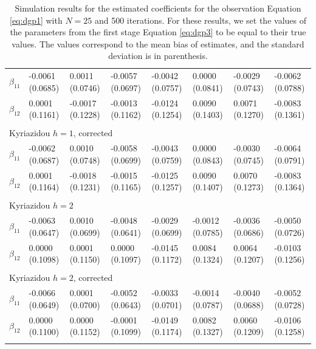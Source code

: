 \begin{table}
\begin{adjustwidth}{-.5in}{-.5in}
\begin{tabular}{p{3cm}p{1.3cm}p{1.3cm}p{1.3cm}p{1.3cm}p{1.3cm}p{1.3cm}p{1.3cm}}
       \hline
        $\beta_{11}$  & -0.0061 (0.0685) & 0.0011 (0.0746) & -0.0057 (0.0697) & -0.0042 (0.0757) & 0.0000 (0.0841) &  -0.0029 (0.0743) & -0.0062 (0.0788) \\
        $\beta_{12}$  & 0.0001 (0.1161) & -0.0017 (0.1228) & -0.0013 (0.1162) & -0.0124 (0.1254) & 0.0090 (0.1403) &  0.0071 (0.1270) & -0.0083 (0.1361) \\
         & & & & & & & \\
            \hline
        \multicolumn{8}{l}{Kyriazidou $h=1$, corrected} \\
       \hline
        $\beta_{11}$  & -0.0062 (0.0687) & 0.0010 (0.0748) & -0.0058 (0.0699) & -0.0043 (0.0759) & 0.0000 (0.0843) &  -0.0030 (0.0745) & -0.0064 (0.0791) \\
        $\beta_{12}$  & 0.0001 (0.1164) & -0.0018 (0.1231) & -0.0015 (0.1165) & -0.0125 (0.1257) & 0.0090 (0.1407) &  0.0070 (0.1273) & -0.0083 (0.1364)\\
         & & & & & & & \\
        \hline
        \multicolumn{8}{l}{Kyriazidou $h=2$} \\
        \hline
         $\beta_{11}$  & -0.0063 (0.0647) & 0.0010 (0.0699) & -0.0048 (0.0641) & -0.0029 (0.0699) &-0.0012 (0.0785)  & -0.0036 (0.0686) & -0.0050 (0.0726)\\
         $\beta_{12}$  & 0.0000 (0.1098) & 0.0001 (0.1150) & 0.0000 (0.1097) & -0.0145 (0.1172) & 0.0084 (0.1324) & 0.0064 (0.1207) & -0.0103 (0.1256) \\
         & & & & & & & \\
         \hline
         \multicolumn{8}{l}{Kyriazidou $h=2$, corrected} \\
        \hline
         $\beta_{11}$  & -0.0066 (0.0649) & 0.0001 (0.0700) & -0.0052 (0.0643) & -0.0033 (0.0701) & -0.0014 (0.0787) &  -0.0040 (0.0688) & -0.0052 (0.0728) \\
         $\beta_{12}$  & 0.0000 (0.1100) & 0.0000 (0.1152) & -0.0001 (0.1099) & -0.0149 (0.1174) & 0.0082 (0.1327) &  0.0060 (0.1209) & -0.0106 (0.1258)\\
              & & & & & & & \\
         \hline
    \end{tabular}
    \caption{\footnotesize{Simulation results for the estimated coefficients for the observation Equation \ref{eq:dgp1} with $N=25$ and 500 iterations. For these results, we set the values of the parameters from the first stage Equation \ref{eq:dgp3} to be equal to their true values. The values correspond to the mean bias of estimates, and the standard deviation is in parenthesis.}}
    \label{tab:4}
    \end{adjustwidth}
\end{table}

